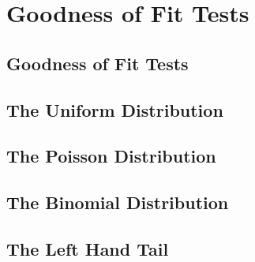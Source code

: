 \documentclass[../maths.tex]{subfiles}
\begin{document}
\chapter{Goodness of Fit Tests}
\section{Goodness of Fit Tests}
\section{The Uniform Distribution}
\section{The Poisson Distribution}
\section{The Binomial Distribution}
\section{The Left Hand Tail}
\end{document}
